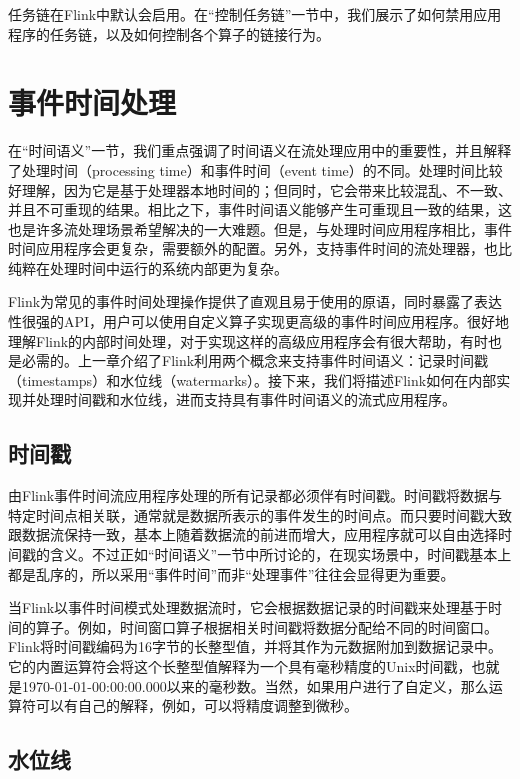 \documentclass[cn,11pt,chinese]{elegantbook}
\begin{document}
任务链在Flink中默认会启用。在``控制任务链''一节中，我们展示了如何禁用应用程序的任务链，以及如何控制各个算子的链接行为。

\hypertarget{ux4e8bux4ef6ux65f6ux95f4ux5904ux7406}{%
\section{事件时间处理}\label{ux4e8bux4ef6ux65f6ux95f4ux5904ux7406}}

在``时间语义''一节，我们重点强调了时间语义在流处理应用中的重要性，并且解释了处理时间（processing
time）和事件时间（event
time）的不同。处理时间比较好理解，因为它是基于处理器本地时间的；但同时，它会带来比较混乱、不一致、并且不可重现的结果。相比之下，事件时间语义能够产生可重现且一致的结果，这也是许多流处理场景希望解决的一大难题。但是，与处理时间应用程序相比，事件时间应用程序会更复杂，需要额外的配置。另外，支持事件时间的流处理器，也比纯粹在处理时间中运行的系统内部更为复杂。

Flink为常见的事件时间处理操作提供了直观且易于使用的原语，同时暴露了表达性很强的API，用户可以使用自定义算子实现更高级的事件时间应用程序。很好地理解Flink的内部时间处理，对于实现这样的高级应用程序会有很大帮助，有时也是必需的。上一章介绍了Flink利用两个概念来支持事件时间语义：记录时间戳（timestamps）和水位线（watermarks）。接下来，我们将描述Flink如何在内部实现并处理时间戳和水位线，进而支持具有事件时间语义的流式应用程序。

\hypertarget{ux65f6ux95f4ux6233}{%
\subsection{时间戳}\label{ux65f6ux95f4ux6233}}

由Flink事件时间流应用程序处理的所有记录都必须伴有时间戳。时间戳将数据与特定时间点相关联，通常就是数据所表示的事件发生的时间点。而只要时间戳大致跟数据流保持一致，基本上随着数据流的前进而增大，应用程序就可以自由选择时间戳的含义。不过正如``时间语义''一节中所讨论的，在现实场景中，时间戳基本上都是乱序的，所以采用``事件时间''而非``处理事件''往往会显得更为重要。

当Flink以事件时间模式处理数据流时，它会根据数据记录的时间戳来处理基于时间的算子。例如，时间窗口算子根据相关时间戳将数据分配给不同的时间窗口。Flink将时间戳编码为16字节的长整型值，并将其作为元数据附加到数据记录中。它的内置运算符会将这个长整型值解释为一个具有毫秒精度的Unix时间戳，也就是1970-01-01-00:00:00.000以来的毫秒数。当然，如果用户进行了自定义，那么运算符可以有自己的解释，例如，可以将精度调整到微秒。

\hypertarget{ux6c34ux4f4dux7ebf-1}{%
\subsection{水位线}\label{ux6c34ux4f4dux7ebf-1}}
\end{document}
